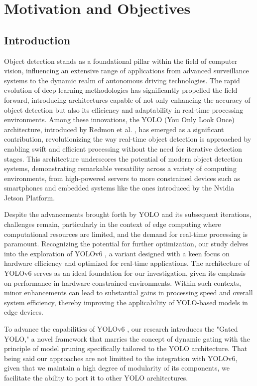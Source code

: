 \section{Motivation and Objectives}  

\subsection{Introduction}

Object detection stands as a foundational pillar within the field of computer vision, influencing an extensive range of applications from advanced surveillance systems to the dynamic realm of autonomous driving technologies. The rapid evolution of deep learning methodologies has significantly propelled the field forward, introducing architectures capable of not only enhancing the accuracy of object detection but also its efficiency and adaptability in real-time processing environments. Among these innovations, the YOLO (You Only Look Once) architecture, introduced by Redmon et al. \cite{redmon2016you}, has emerged as a significant contribution, revolutionizing the way real-time object detection is approached by enabling swift and efficient processing without the need for iterative detection stages. This architecture underscores the potential of modern object detection systems, demonstrating remarkable versatility across a variety of computing environments, from high-powered servers to more constrained devices such as smartphones and embedded systems like the ones introduced by the Nvidia Jetson Platform.

Despite the advancements brought forth by YOLO and its subsequent iterations, challenges remain, particularly in the context of edge computing where computational resources are limited, and the demand for real-time processing is paramount. Recognizing the potential for further optimization, our study delves into the exploration of YOLOv6 \cite{li2022yolov6,li2023yolov6}, a variant designed with a keen focus on hardware efficiency and optimized for real-time applications. The architecture of YOLOv6 \cite{li2022yolov6,li2023yolov6} serves as an ideal foundation for our investigation, given its emphasis on performance in hardware-constrained environments. Within such contexts, minor enhancements can lead to substantial gains in processing speed and overall system efficiency, thereby improving the applicability of YOLO-based models in edge devices.

To advance the capabilities of YOLOv6 \cite{li2022yolov6,li2023yolov6}, our research introduces the "Gated YOLO," a novel framework that marries the concept of dynamic gating with the principle of model pruning specifically tailored to the YOLO architecture. That being said our approaches are not limitted to the integration with YOLOv6, given that we maintain a high degree of modularity of its components, we facilitate the ability to port it to other YOLO architectures. 

